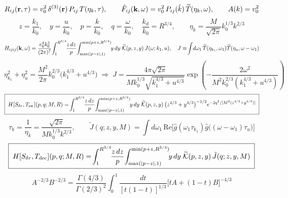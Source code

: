 \documentclass[10pt,prd,aps,nobibnotes,superscriptaddress,preprintnumbers,notitlepage]{revtex4-1}
\newcommand{\khat}{\hat{k}}
\newcommand{\br}{{\bf r}}
\newcommand{\kb}{{\bf k}}
\begin{document}
\begin{equation}
  R_{ij}(\br,\tau)=v_0^2\,\delta^{(3)}(\br)\,P_{ij}\,T(\eta_k,\tau),
  \qquad
  \tilde F_{ij}(\kb,\omega)=v_0^2\,P_{ij}(\khat)\,\widetilde T(\eta_k,\omega),
  \qquad
  A(k)=v_0^2
  \label{A:Fwhite}
\end{equation}
\begin{equation}
  z=\frac{k_1}{k_0},\quad y=\frac{u}{k_0},\quad p=\frac{k}{k_0},\quad q=\frac{\omega}{k_0},
  \quad \frac{k_d}{k_0}=R^{3/4},
  \qquad
  \eta_k=\frac{M}{\sqrt{2\pi}}k_0^{1/3}k^{2/3}
  \label{A:whitevars}
\end{equation}
\begin{equation}
  H_{ijij}(\kb,\omega)=\frac{v_0^4k_0^2}{(2\pi)^7}\!\int_1^{R^{3/4}}\!\!\frac{z\,dz}{p}
  \!\int_{\max(|p-z|,1)}^{\min(p+z,R^{3/4})}\!\!y\,dy\;\widetilde{\mathcal{K}}(p,z,y)\,J(\omega;k_1,u),
  \quad
  J\equiv\!\int\!d\omega_1\,\widetilde T(\eta_{k_1},\omega_1)\widetilde T(\eta_u,\omega-\omega_1)
  \label{A:Hwhite}
\end{equation}
\begin{equation}
  \eta_{k_1}^2+\eta_u^2=\frac{M^2}{2\pi}k_0^{2/3}\bigl(k_1^{4/3}+u^{4/3}\bigr)
  \;\Longrightarrow\;
  J=\frac{4\pi\sqrt{2\pi}}{Mk_0^{1/3}\sqrt{k_1^{4/3}+u^{4/3}}}
  \exp\!\left(-\frac{2\omega^2}{M^2k_0^{2/3}(k_1^{4/3}+u^{4/3})}\right)
  \label{A:Jwhite}
\end{equation}
\begin{equation}
  \boxed{\;
  H[S_{\delta r},T_{\rm sw}](p,q;M,R)=\!\int_1^{R^{3/4}}\!\!\frac{z\,dz}{p}
  \!\int_{\max(|p-z|,1)}^{\min(p+z,R^{3/4})}\!\!y\,dy\;\widetilde{\mathcal{K}}(p,z,y)\,
  \bigl(z^{4/3}+y^{4/3}\bigr)^{-1/2}e^{-2q^2/[M^2(z^{4/3}+y^{4/3})]}\;}
  \label{A:HwhiteSW}
\end{equation}
\begin{equation}
  \tau_k=\frac{1}{\eta_k}=\frac{\sqrt{2\pi}}{Mk_0^{1/3}k^{2/3}},
  \qquad
  \tilde J(q;z,y,M)=\!\int\!d\omega_1\,\mathrm{Re}\bigl[\hat g(\omega_1\tau_{k_1})\hat g\bigl((\omega-\omega_1)\tau_u\bigr)\bigr]
  \label{A:Jtilde}
\end{equation}
\begin{equation}
  \boxed{\;
  H[S_{\delta r},T_{\rm dec}](p,q;M,R)=\!\int_1^{R^{3/4}}\!\!\frac{z\,dz}{p}
  \!\int_{\max(|p-z|,1)}^{\min(p+z,R^{3/4})}\!\!y\,dy\;\widetilde{\mathcal{K}}(p,z,y)\,\tilde J(q;z,y,M)\;}
  \label{A:HwhiteDEC}
\end{equation}
\begin{equation}
  A^{-2/3}B^{-2/3}=\frac{\Gamma(4/3)}{\Gamma(2/3)^2}\!\int_0^1\!\frac{dt}{[t(1-t)]^{1/3}}
  \bigl[tA+(1-t)B\bigr]^{-4/3}
  \label{A:feynman}
\end{equation}
\end{document}
